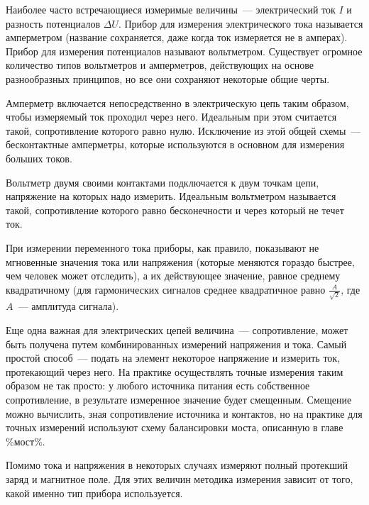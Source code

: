 
Наиболее часто встречающиеся измеримые величины~--- электрический ток $I$ и разность потенциалов $\Delta U$. Прибор для измерения электрического тока называется амперметром (название сохраняется, даже когда ток измеряется не в амперах). Прибор для измерения потенциалов называют вольтметром. Существует огромное количество типов вольтметров и амперметров, действующих на основе разнообразных принципов, но все они сохраняют некоторые общие черты.

Амперметр включается непосредственно в электрическую цепь таким образом, чтобы измеряемый ток проходил через него. Идеальным при этом считается такой, сопротивление которого равно нулю. Исключение из этой общей схемы~--- бесконтактные амперметры, которые используются в основном для измерения больших токов. 

Вольтметр двумя своими контактами подключается к двум точкам цепи, напряжение на которых надо измерить. Идеальным вольтметром называется такой, сопротивление которого равно бесконечности и через который не течет ток.

При измерении переменного тока приборы, как правило, показывают не мгновенные значения тока или напряжения (которые меняются гораздо быстрее, чем человек может отследить), а их действующее значение, равное среднему квадратичному (для гармонических сигналов среднее квадратичное равно $\frac{A}{\sqrt{2}}$, где $A$~--- амплитуда сигнала).

Еще одна важная для электрических цепей величина~--- сопротивление, может быть получена путем комбинированных измерений напряжения и тока. Самый простой способ~--- подать на элемент некоторое напряжение и измерить ток, протекающий через него. На практике осуществлять точные измерения таким образом не так просто: у любого источника питания есть собственное сопротивление, в результате измеренное значение будет смещенным. Смещение можно вычислить, зная сопротивление источника и контактов, но на практике для точных измерений используют схему балансировки моста, описанную в главе \%мост\%.

Помимо тока и напряжения в некоторых случаях измеряют полный протекший заряд и магнитное поле. Для этих величин методика измерения зависит от того, какой именно тип прибора используется.

